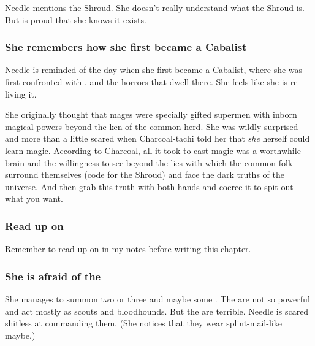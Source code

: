 Needle mentions the Shroud. 
She doesn't really understand what the Shroud is. 
But is proud that she knows it exists. 





\subsubsection{She remembers how she first became a Cabalist}
Needle is reminded of the day when she first became a Cabalist, where she was first confronted with \itzach, \Nyx{} and the horrors that dwell there. 
She feels like she is re-living it. 


She originally thought that mages were specially gifted supermen with inborn magical powers beyond the ken of the common herd. 
She was wildly surprised and more than a little scared when Charcoal-tachi told her that \emph{she} herself could learn magic. 
According to Charcoal, all it took to cast magic was a worthwhile brain and the willingness to see beyond the lies with which the common folk surround themselves (code for the Shroud) and face the dark truths of the universe. 
And then grab this truth with both hands and coerce it to spit out what you want. 





\subsubsection{Read up on \banes}
Remember to read up on \banes{} in my notes before writing this chapter. 





\subsubsection{She is afraid of the \banes}
She manages to summon two or three \lesserbanes{} and maybe some \banerats. 
The \banerats{} are not so powerful and act mostly as scouts and bloodhounds. 
But the \banes{} are terrible. 
Needle is scared shitless at commanding them. 
(She notices that they wear splint-mail-like \armour\prikker maybe.)

